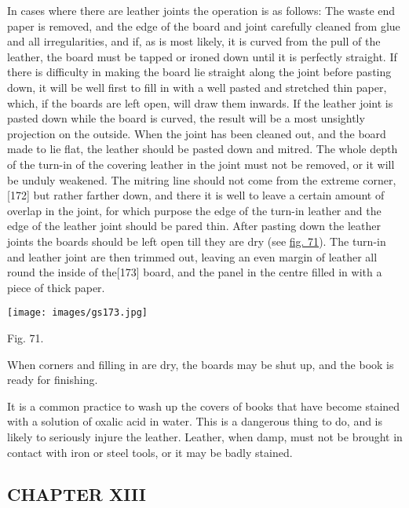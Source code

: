 \documentclass[
]{article}
\begin{document}
In cases where there are leather joints the operation is as follows: The
waste end paper is removed, and the edge of the board and joint
carefully cleaned from glue and all irregularities, and if, as is most
likely, it is curved from the pull of the leather, the board must be
tapped or ironed down until it is perfectly straight. If there is
difficulty in making the board lie straight along the joint before
pasting down, it will be well first to fill in with a well pasted and
stretched thin paper, which, if the boards are left open, will draw them
inwards. If the leather joint is pasted down while the board is curved,
the result will be a most unsightly projection on the outside. When the
joint has been cleaned out, and the board made to lie flat, the leather
should be pasted down and mitred. The whole depth of the turn-in of the
covering leather in the joint must not be removed, or it will be unduly
weakened. The mitring line should not come from the extreme
corner,{\protect\hypertarget{Page_172}{}{{[}172{]}}} but rather farther
down, and there it is well to leave a certain amount of overlap in the
joint, for which purpose the edge of the turn-in leather and the edge of
the leather joint should be pared thin. After pasting down the leather
joints the boards should be left open till they are dry (see
\protect\hyperlink{Fig_71}{fig. 71}). The turn-in and leather joint are
then trimmed out, leaving an even margin of leather all round the inside
of the{\protect\hypertarget{Page_173}{}{{[}173{]}}} board, and the panel
in the centre filled in with a piece of thick paper.

\protect\hypertarget{Fig_71}{}{}
\texttt{[image: images/gs173.jpg]}

Fig. 71.

When corners and filling in are dry, the boards may be shut up, and the
book is ready for finishing.

It is a common practice to wash up the covers of books that have become
stained with a solution of oxalic acid in water. This is a dangerous
thing to do, and is likely to seriously injure the leather. Leather,
when damp, must not be brought in contact with iron or steel tools, or
it may be badly stained.

\hypertarget{chapter-xiii}{%
\subsection[CHAPTER
XIII]{\texorpdfstring{\protect\hypertarget{CHAPTER_XIII}{}{}CHAPTER
XIII}{CHAPTER XIII}}\label{chapter-xiii}}
\end{document}
